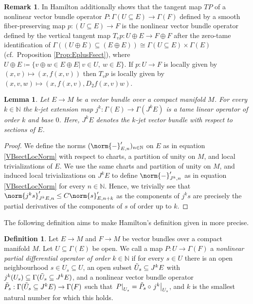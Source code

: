 \documentclass[12pt,a4paper]{article}
\theoremstyle{plain}
\newtheorem{lemma}[theorem]{Lemma}
\theoremstyle{definition}
\newtheorem{definition}[theorem]{Definition}
\newtheorem{remark}[theorem]{Remark}
\newcommand{\N}{\mathbb{N}}
\newcommand{\nnorm}[2]{\norm{#1}_{#2}}
\begin{document}
\begin{remark}
In \cite[Part I, Example 3.6.5]{hamilton} Hamilton additionally shows that the tangent map $TP$ of a nonlinear vector bundle operator $P:\Gamma(U\subseteq E)\to \Gamma(F)$ defined by a smooth fiber-preserving map $p:(U\subseteq E)\to F$ is the nonlinear vector bundle operator defined by the vertical tangent map $T_vp:U\oplus E\to F\oplus F$ after the zero-tame identification of $\Gamma((U\oplus E)\subseteq (E\oplus E))\cong \Gamma(U\subseteq E)\times \Gamma(E)$ (cf.~Proposition \ref{Prop:EplusFsect}), where $U\oplus E\coloneqq \{v\oplus w\in E\oplus E|~v\in U,~w\in E\}$. If $p:U\to F$ is locally given by $(x,v)\mapsto (x,f(x,v))$ then $T_vp$ is locally given by $(x,v,w)\mapsto (x,f(x,v),D_2f(x,v)w)$.
\end{remark}



\begin{lemma}
Let $E\to M$ be a vector bundle over a compact manifold $M$. 
For every $k\in\N$ the $k$-jet extension map $j^k:\Gamma(E)\to \Gamma(J^kE)$ is a tame linear operator of order $k$ and base $0$. 
Here, $J^kE$ denotes the $k$-jet vector bundle with respect to sections of $E$.
\end{lemma}
\begin{proof}
We define the norms $(\nnorm{-}{E,n}')_{n\in \N}$ on $E$ as in equation \eqref{VBsectLocNorm} with respect to charts, a partition of unity on $M$, and local trivializations of $E$. We use the same charts and partition of unity on $M$, and induced local trivializations on $J^kE$ to define $\nnorm{-}{J^k,n}'$ as in equation \eqref{VBsectLocNorm} for every $n\in \N$. Hence, we trivially see that $\nnorm{j^ks}{J^kE,n}'\leq C \nnorm{s}{E,n+k}'$ as the components of $j^ks$ are precisely the partial derivatives of the components of $s$ of order up to $k$.   
\end{proof}


The following definition aims to make Hamilton's definition given in \cite[p.~146]{hamilton} more precise.
\begin{definition}
\label{Def:NonlinPartDiffOp}
Let $E\to M$ and $F\to M$ be vector bundles over a compact manifold $M$. Let $U\subseteq \Gamma(E)$ be open. We call a map $P:U\to \Gamma(F)$ a \textit{nonlinear partial differential operator of order $k\in \N$} if for every $s\in U$ there is an open neighbourhood $s\in U_s\subseteq U$, an open subset $\Tilde{U}_s\subseteq J^kE$ with $j^k(U_s)\subseteq \Gamma(\Tilde{U}_s\subseteq J^kE)$, and a nonlinear vector bundle operator $\Tilde{P}_s:\Gamma(\Tilde{U}_s\subseteq J^kE)\to \Gamma(F)$ such that $\left.P\right|_{U_s}=\Tilde{P}_s\circ \left.j^k\right|_{U_s}$, and $k$ is the smallest natural number for which this holds. 
\end{definition}
\end{document}
